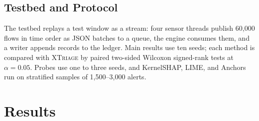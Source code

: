 \documentclass[journal]{IEEEtran}
\begin{document}
\subsection{Testbed and Protocol}
The testbed replays a test window as a stream: four sensor threads publish 60{,}000 flows in time order as JSON batches to a queue, the engine consumes them, and a writer appends records to the ledger. Main results use ten seeds; each method is compared with \textsc{XTriage} by paired two-sided Wilcoxon signed-rank tests at $\alpha=0.05$. Probes use one to three seeds, and KernelSHAP, LIME, and Anchors run on stratified samples of 1{,}500--3{,}000 alerts.

\section{Results}
\label{sec:results}
\end{document}
